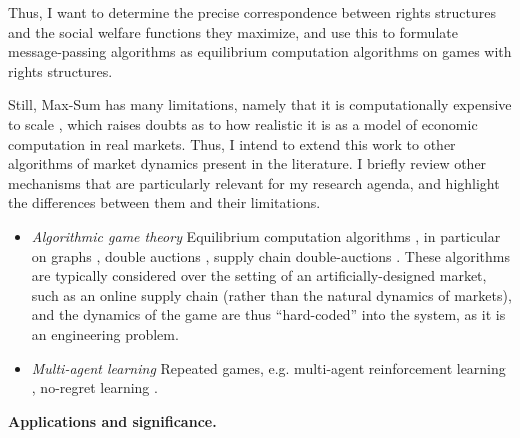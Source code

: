 \documentclass{article}
\newcommand{\statement}[1]{\par\medskip
  {\textbf{#1.}}\space
}
\begin{document}
Thus, I want to determine the precise correspondence between rights structures and the social welfare functions they maximize, and use this to formulate message-passing algorithms as equilibrium computation algorithms on games with rights structures.

\par\medskip

Still, Max-Sum has many limitations, namely that it is computationally expensive to scale \cite{khan}, which raises doubts as to how realistic it is as a model of economic computation in real markets. Thus, I intend to extend this work to other algorithms of market dynamics present in the literature. I briefly review other mechanisms that are particularly relevant for my research agenda, and highlight the differences between them and their limitations. 

\begin{itemize}
    \item \emph{Algorithmic game theory} Equilibrium computation algorithms \cite{agt:5, tesfatsion, gode}, in particular on graphs \cite{kakade}, double auctions \cite{tagiew, mcafee, myerson}, supply chain double-auctions \cite{babaioff-nisan, babaioff-walsh}. These algorithms are typically considered over the setting of an artificially-designed market, such as an online supply chain (rather than the natural dynamics of markets), and the dynamics of the game are thus ``hard-coded'' into the system, as it is an engineering problem. 
    \item \emph{Multi-agent learning} Repeated games, e.g. multi-agent reinforcement learning \cite{zhang, canese}, no-regret learning \cite{calliess}. 
\end{itemize}

\statement{Applications and significance}

\end{document}
